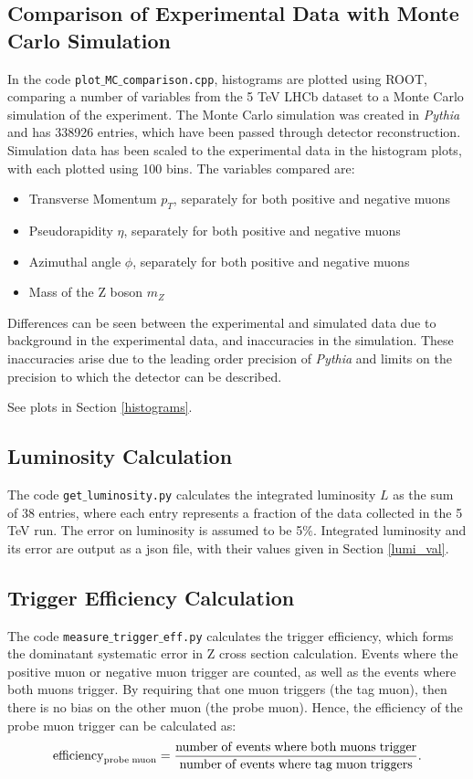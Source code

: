 \documentclass[a4paper]{article}
\begin{document}
\subsection{Comparison of Experimental Data with Monte Carlo Simulation}
In the code \texttt{plot$\_$MC$\_$comparison.cpp}, histograms are plotted using ROOT, comparing a number of variables from the 5 TeV LHCb dataset to a Monte Carlo simulation of the experiment. The Monte Carlo simulation was created in \textit{Pythia} and has 338926 entries, which have been passed through detector reconstruction. Simulation data has been scaled to the experimental data in the histogram plots, with each plotted using 100 bins.
The variables compared are:
\begin{itemize}
  \item Transverse Momentum $p_T$, separately for both positive and negative muons
  \item Pseudorapidity $\eta$, separately for both positive and negative muons
  \item Azimuthal angle $\phi$, separately for both positive and negative muons
  \item Mass of the Z boson $m_Z$
\end{itemize}

Differences can be seen between the experimental and simulated data due to background in the experimental data, and inaccuracies in the simulation. These inaccuracies arise due to the leading order precision of \textit{Pythia} and limits on the precision to which the detector can be described.

See plots in Section \ref{histograms}.

\subsection{Luminosity Calculation}
The code \texttt{get$\_$luminosity.py} calculates the integrated luminosity $L$ as the sum of 38 entries, where each entry represents a fraction of the data collected in the 5 TeV run.
The error on luminosity is assumed to be 5$\%$.
Integrated luminosity and its error are output as a json file, with their values given in Section \ref{lumi_val}.
 
\subsection{Trigger Efficiency Calculation}
The code \texttt{measure$\_$trigger$\_$eff.py} calculates the trigger efficiency, which forms the dominatant systematic error in Z cross section calculation. 
Events where the positive muon or negative muon trigger are counted, as well as the events where both muons trigger. 
By requiring that one muon triggers (the tag muon), then there is no bias on the other muon (the probe muon). Hence, the efficiency of the probe muon trigger can be calculated as:
\begin{equation}
{\rm efficiency}_{{\rm probe \;  muon}} = \frac{{\rm number \; of \; events \; where \; both \; muons \; trigger}}{{\rm number \; of \; events \; where \; tag \; muon \; triggers}}.
\end{equation}
\end{document}
